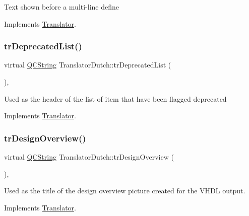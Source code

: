 Text shown before a multi-\/line define 

Implements \mbox{\hyperlink{class_translator}{Translator}}.

\mbox{\label{class_translator_dutch_a9dfeab077b7d62a76044567940295a9d}} 
\subsubsection{\texorpdfstring{trDeprecatedList()}{trDeprecatedList()}}
{\footnotesize\ttfamily virtual \mbox{\hyperlink{class_q_c_string}{Q\+C\+String}} Translator\+Dutch\+::tr\+Deprecated\+List (\begin{DoxyParamCaption}{ }\end{DoxyParamCaption})\hspace{0.3cm}{\ttfamily [inline]}, {\ttfamily [virtual]}}

Used as the header of the list of item that have been flagged deprecated 

Implements \mbox{\hyperlink{class_translator}{Translator}}.

\mbox{\label{class_translator_dutch_af68a902bbf49d6c361540d5869e4ca31}} 
\subsubsection{\texorpdfstring{trDesignOverview()}{trDesignOverview()}}
{\footnotesize\ttfamily virtual \mbox{\hyperlink{class_q_c_string}{Q\+C\+String}} Translator\+Dutch\+::tr\+Design\+Overview (\begin{DoxyParamCaption}{ }\end{DoxyParamCaption})\hspace{0.3cm}{\ttfamily [inline]}, {\ttfamily [virtual]}}

Used as the title of the design overview picture created for the V\+H\+DL output. 

Implements \mbox{\hyperlink{class_translator}{Translator}}.

\mbox{\label{class_translator_dutch_a45ead8f9a25d7053edb32ad096c96fa9}} 
